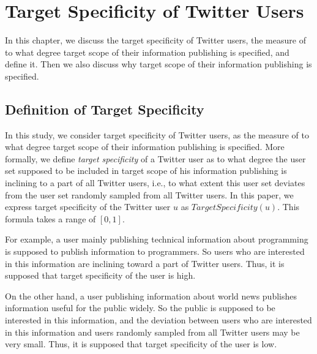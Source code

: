 \section{Target Specificity of Twitter Users}
\label{sec:Target Specificity}

In this chapter, we discuss the target specificity of Twitter users, the
measure of to what degree target scope of their information publishing
is specified, and define it.  Then we also discuss why target scope of
their information publishing is specified.

\subsection{Definition of Target Specificity}
\label{subsec:Definition}

In this study, we consider target specificity of Twitter users, as
the measure of to what degree target scope of their information publishing is
specified.  More formally, we define \emph{target specificity} of a
Twitter user as to what degree the user set supposed to be included in
target scope of his information publishing is inclining to a
part of all Twitter users, i.e., to what extent this user set deviates
from the user set randomly sampled from all Twitter users.  In this
paper, we express target specificity of the Twitter user $u$ as
$\mathit{TargetSpecificity}(u)$. This formula takes a range of $[0, 1]$.

For example, a user mainly publishing technical information about
programming is supposed to publish information to programmers.  So
users who are interested in this information are inclining toward a part
of Twitter users.  Thus, it is supposed that target specificity of
the user is high.

On the other hand, a user publishing information about world news
publishes information useful for the public widely.  So the public is
supposed to be interested in this information, and the deviation between
users who are interested in this information and users randomly sampled
from all Twitter users may be very small.  Thus, it is supposed
that target specificity of the user is low.

